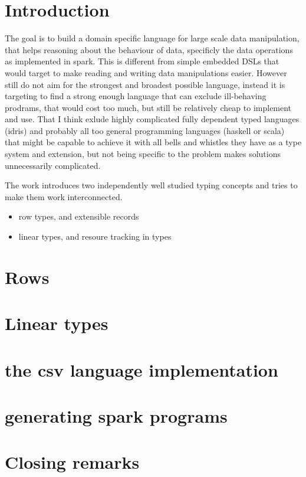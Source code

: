 \documentclass{amsart}
\begin{document}
  \section{Introduction}
The goal is to build a domain specific language for large scale data
manipulation, that helps reasoning about the behaviour of data,
specificly the data operations as implemented in spark. This is
different from simple embedded DSLs that would target to make reading
and writing data manipulations easier. However still do not aim for
the strongest and broadest possible language, instead it is targeting
to find a strong enough language that can exclude ill-behaving
prodrams, that would cost too much, but still be relatively cheap to
implement and use. That I think exlude highly complicated fully
dependent typed languages (idris) and probably all too general
programming languages (haskell or scala) that might be capable to
achieve it with all bells and whistles they have as a type system and
extension, but not being specific to the problem makes solutions
unnecessarily complicated.

The work introduces two independently well studied typing concepts and
tries to make them work interconnected.
\begin{itemize}
  \item row types, and extensible records
  \item linear types, and resoure tracking in types
  \end{itemize}

  \section{Rows}
  \section{Linear types}
  \section{the csv language implementation}
  \section{generating spark programs}
  \section{Closing remarks}
\end{document}
